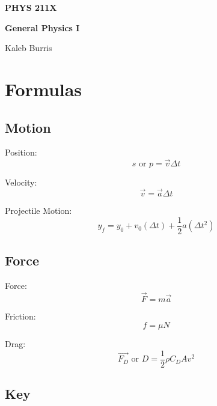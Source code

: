 \documentclass[12pt, letterpaper]{book}
\begin{document}
    \begin{titlepage}
        \Huge \textbf{PHYS 211X}

        \huge \textbf{General Physics I}

        \vfill

        \Large Kaleb Burris
    \end{titlepage}

    \section*{Formulas}
    \subsection*{Motion}

    Position:
    \begin{equation}
        s \text{ or } p = \vec{v}\Delta t
    \end{equation}

    Velocity:
    \begin{equation}
        \vec{v} = \vec{a}\Delta t
    \end{equation}

    Projectile Motion:
    \begin{equation}
        \label{eqn::yfinal}
        y_{f} = y_{0} + v_{0}(\Delta t) + \frac{1}{2}a(\Delta t^{2})
    \end{equation}

    \subsection*{Force}
    Force:
    \begin{equation}
        \vec{F} = m\vec{a}
    \end{equation}

    Friction:
    \begin{equation}
        f = \mu N
    \end{equation}

    Drag: 
    \begin{equation}
        \vec{F_D}\text{ or }D = \frac{1}{2}\rho C_{D}Av^{2}
    \end{equation}

    \subsection*{Key}
\end{document}
